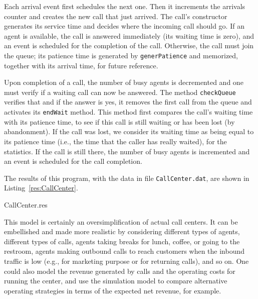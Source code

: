 Each arrival event first schedules the next one.
Then it increments the arrivals counter and creates the new call that just
arrived.  The call's constructor generates its service time and decides
where the incoming call should go.
If an agent is available, the call is answered immediately
(its waiting time is zero), and an event is scheduled for the completion
of the call.   Otherwise, the call must join the queue;
its patience time is generated by \texttt{generPatience} and memorized,
together with its arrival time, for future reference.

Upon completion of a call, the number of busy agents is decremented
and one must verify if a waiting call can now be answered.
The method \texttt{checkQueue} verifies that and if the answer is yes,
it removes the first call from the queue and activates its \texttt{endWait}
method.
This method first compares the call's waiting time with its patience time,
to see if this call is still waiting or has been lost (by abandonment).
If the call was lost, we consider its waiting time
as being equal to its patience time (i.e., the time that the caller
has really waited), for the statistics.
If the call is still there, the number of busy agents is incremented
and an event is scheduled for the call completion.

The results of this program, with the data in file
\texttt{CallCenter.dat}, are shown in Listing~\ref{res:CallCenter}.

%
{CallCenter.res}


This model is certainly an oversimplification of actual call centers.
It can be embellished and made more realistic by considering
different types of agents, different types of calls,
agents taking breaks for lunch, coffee, or going to the restroom,
agents making outbound calls to reach customers when the inbound
traffic is low (e.g., for marketing purpose or for returning calls),
and so on.   One could also model the revenue generated by calls and
the operating costs for running the center,
and use the simulation model to compare alternative operating strategies
in terms of the expected net revenue, for example.
